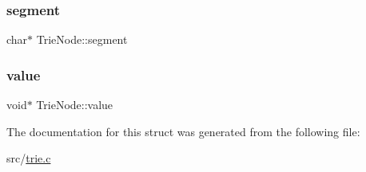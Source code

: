 \subsubsection{\texorpdfstring{segment}{segment}}
{\footnotesize\ttfamily char$\ast$ Trie\+Node\+::segment}

\mbox{\label{structTrieNode_a764f0b34ed1c944c3e1645d9d24d8327}} 
\subsubsection{\texorpdfstring{value}{value}}
{\footnotesize\ttfamily void$\ast$ Trie\+Node\+::value}



The documentation for this struct was generated from the following file\+:\begin{DoxyCompactItemize}
\item 
src/\mbox{\hyperlink{trie_8c}{trie.\+c}}\end{DoxyCompactItemize}
